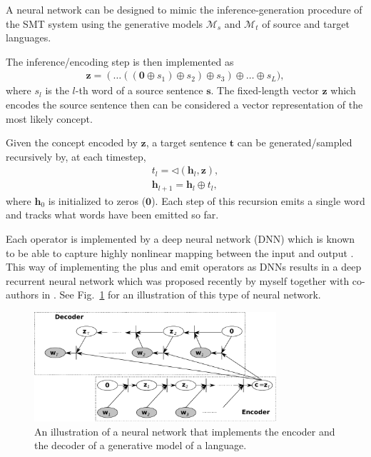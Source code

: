 \documentclass[11pt, oneside]{essay}
\newcommand{\vect}[1]{\mathbf{#1}}
\newcommand{\vh}[0]{\vect{h}}
\newcommand{\vs}[0]{\vect{s}}
\newcommand{\vt}[0]{\vect{t}}
\newcommand{\vz}[0]{\vect{z}}
\newcommand{\vzero}[0]{\vect{0}}
\begin{document}
A neural network can be designed to mimic the
inference-generation procedure of the SMT system using the
generative models $\mathcal{M}_s$ and $\mathcal{M}_t$ of source
and target languages. 

The inference/encoding step is then implemented as
\begin{align}
\label{eq:encoder}
\vz = (\dots ((\vzero \oplus s_1) \oplus s_2) \oplus s_3) \oplus \dots
\oplus s_L),
\end{align}
where $s_l$ is the $l$-th word of a source sentence $\vs$. The
fixed-length vector $\vz$ which encodes the source sentence then
can be considered a vector representation of the most likely
concept.

Given the concept encoded by $\vz$, a target sentence $\vt$ can
be generated/sampled recursively by, at each timestep,
\begin{align}
\label{eq:decoder}
t_l = \lhd \left(\vh_l, \vz\right), \nonumber\\
\vh_{l+1} = \vh_l \oplus t_l,
\end{align}
where $\vh_0$ is initialized to zeros ($\vzero$). Each step of
this recursion emits a single word and tracks what words have
been emitted so far.

Each operator is implemented by a deep neural network (DNN) which
is known to be able to capture highly nonlinear mapping between
the input and output \citep{Rumelhart1986}. This way of
implementing the plus and emit operators as DNNs results in a
deep recurrent neural network which was proposed recently by
myself together with co-authors in \citep{Pascanu2013}. See
Fig.~\ref{fig:autoencoder} for an illustration of this type of
neural network.


\begin{figure}[t]
\centering
\includegraphics[width=0.8\textwidth]{autoencoder.pdf}
\caption{An illustration of a neural network that implements the
    encoder and the decoder of a generative model of a language.}
\label{fig:autoencoder}
\end{figure}
\end{document}
